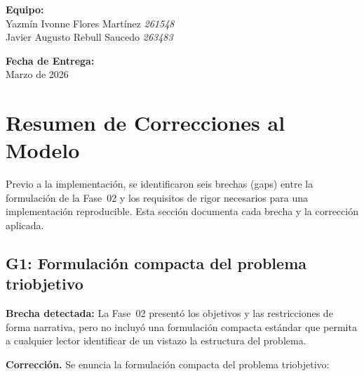 \documentclass[12pt,letterpaper]{article}
\begin{document}
\begin{titlepage}
\begin{center}
    \vfill

    {\normalsize\textbf{Equipo:}}\\[6pt]
    {\normalsize Yazmín Ivonne Flores Martínez \textcolor{uacjgray}{\textbullet} \textit{261548}}\\[3pt]
    {\normalsize Javier Augusto Rebull Saucedo \textcolor{uacjgray}{\textbullet} \textit{263483}}

    \vspace{0.8cm}

    {\normalsize\textbf{Fecha de Entrega:}}\\[4pt]
    {\normalsize Marzo de 2026}

    \vspace{1.0cm}

\end{center}
\end{titlepage}

\tableofcontents
\newpage

\section{Resumen de Correcciones al Modelo}
\label{sec:correcciones}

Previo a la implementación, se identificaron seis brechas (gaps) entre la formulación de la Fase~02 y los requisitos de rigor necesarios para una implementación reproducible. Esta sección documenta cada brecha y la corrección aplicada.

\subsection{G1: Formulación compacta del problema triobjetivo}

\begin{notebox}
\textbf{Brecha detectada:} La Fase~02 presentó los objetivos y las restricciones de forma narrativa, pero no incluyó una formulación compacta estándar que permita a cualquier lector identificar de un vistazo la estructura del problema.
\end{notebox}

\textbf{Corrección.} Se enuncia la formulación compacta del problema triobjetivo:
\end{document}
